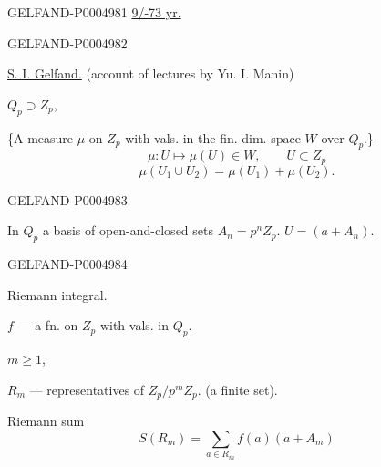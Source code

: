 \begin{GelfandAdjacentEvidence}{GELFAND-P000498}{1}
\uline{9/\mbox{}-73 yr.}
\end{GelfandAdjacentEvidence}
\begin{GelfandAdjacentEvidence}{GELFAND-P000498}{2}


\uline{S. I. Gelfand.} (account of lectures by Yu. I. Manin)

$Q_p\supset Z_p$,

\{A measure $\mu$ on $Z_p$ with vals. in the fin.-dim. space $W$ over $Q_p$.\}
\[
\mu:U\longmapsto\mu(U)\in W,\qquad U\subset Z_p
\]
\[
\mu(U_1\cup U_2)=\mu(U_1)+\mu(U_2).
\]
\end{GelfandAdjacentEvidence}
\begin{GelfandAdjacentEvidence}{GELFAND-P000498}{3}


In $Q_p$ a basis of open-and-closed sets $A_n=p^nZ_p$. \quad $U=(a+A_n)$.
\end{GelfandAdjacentEvidence}
\begin{GelfandAdjacentEvidence}{GELFAND-P000498}{4}


Riemann integral.

$f$ — a fn. on $Z_p$ with vals. in $Q_p$.

$m\ge1$,

$R_m$ — representatives of $Z_p/p^mZ_p$. (a finite set).

Riemann sum
\[
S(R_m)=\sum_{a\in R_m}f(a)(a+A_m)
\]
\end{GelfandAdjacentEvidence}
